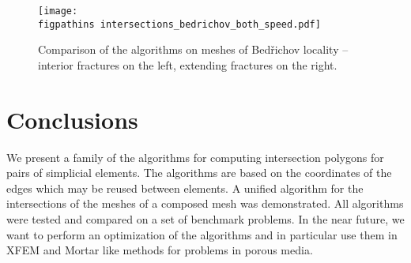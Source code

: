 \begin{figure}[!htb]
    \centering
    \texttt{[image: \\figpathins intersections\_bedrichov\_both\_speed.pdf]}
    \caption{Comparison of the algorithms on meshes of Bed{\v r}ichov locality -- interior fractures on the left,
             extending fractures on the right.}
    \label{fig:bedrichov_speed}
\end{figure}





\section{Conclusions}
\label{sec:conclusins}
We present a family of the algorithms for computing intersection polygons for pairs of simplicial elements.
The algorithms are based on the \plucker coordinates of the edges which may be reused between elements.
A unified algorithm for the intersections of the meshes of a composed mesh was demonstrated. All algorithms were 
tested and compared on a set of benchmark problems. In the near future, we want to perform an optimization of 
the algorithms and in particular use them in XFEM and Mortar 
like methods for problems in porous media.

% 


